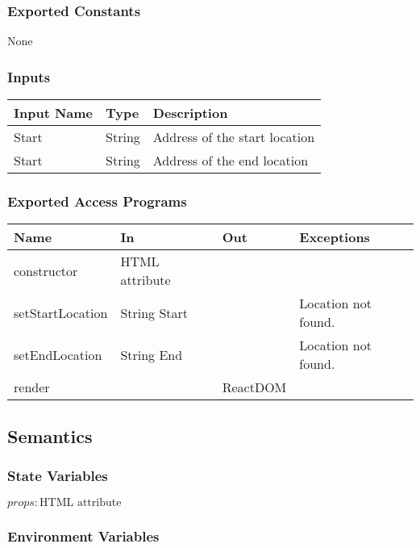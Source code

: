 \documentclass[12pt, titlepage]{article}
\begin{document}
\subsubsection{Exported Constants}

None

\subsubsection{Inputs}
\begin{tabular}{| l | l | l |}
  \hline
  \textbf{Input Name} & \textbf{Type} & \textbf{Description}\\
  \hline
  Start & String & Address of the start location \\
  \hline
  Start & String & Address of the end location \\
  \hline
\end{tabular}

\subsubsection{Exported Access Programs}

\begin{tabular}{| l | l | l | l |}
  \hline
  \textbf{Name} & \textbf{In} & \textbf{Out} & \textbf{Exceptions}\\
  \hline
  constructor & HTML attribute & ~ & ~\\
  \hline
  setStartLocation & String Start & ~ & Location not found.\\
  \hline
  setEndLocation & String End & ~ & Location not found.\\
  \hline
  render & ~ & ReactDOM & ~\\
  \hline
\end{tabular}

\subsection{Semantics}

\subsubsection{State Variables}

$\mathit{props}: \text{HTML attribute}$\\

\subsubsection{Environment Variables}
\end{document}
